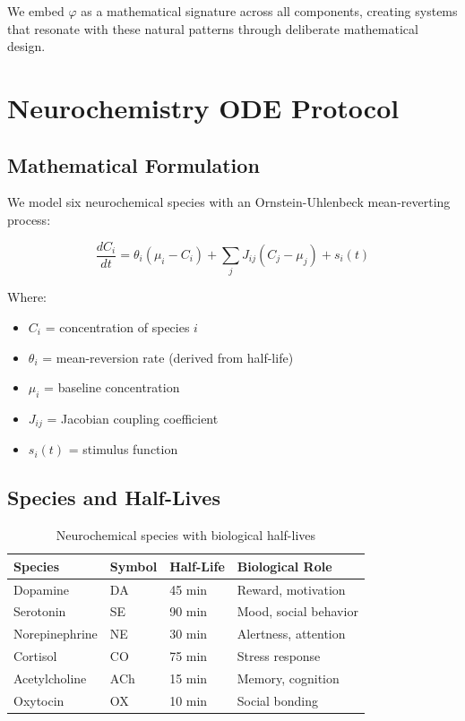 \documentclass[11pt,a4paper]{article}
\begin{document}
We embed $\varphi$ as a mathematical signature across all components, creating 
systems that resonate with these natural patterns through deliberate 
mathematical design.


\section{Neurochemistry ODE Protocol}

\subsection{Mathematical Formulation}

We model six neurochemical species with an Ornstein-Uhlenbeck mean-reverting 
process:

\begin{equation}
\frac{dC_i}{dt} = \theta_i(\mu_i - C_i) + \sum_j J_{ij}(C_j - \mu_j) + s_i(t)
\end{equation}

Where:
\begin{itemize}
  \item $C_i$ = concentration of species $i$
  \item $\theta_i$ = mean-reversion rate (derived from half-life)
  \item $\mu_i$ = baseline concentration
  \item $J_{ij}$ = Jacobian coupling coefficient
  \item $s_i(t)$ = stimulus function
\end{itemize}

\subsection{Species and Half-Lives}

\begin{table}[h]
\centering
\begin{tabular}{llll}
\toprule
Species & Symbol & Half-Life & Biological Role \\
\midrule
Dopamine & DA & 45 min & Reward, motivation \\
Serotonin & SE & 90 min & Mood, social behavior \\
Norepinephrine & NE & 30 min & Alertness, attention \\
Cortisol & CO & 75 min & Stress response \\
Acetylcholine & ACh & 15 min & Memory, cognition \\
Oxytocin & OX & 10 min & Social bonding \\
\bottomrule
\end{tabular}
\caption{Neurochemical species with biological half-lives}
\end{table}
\end{document}

